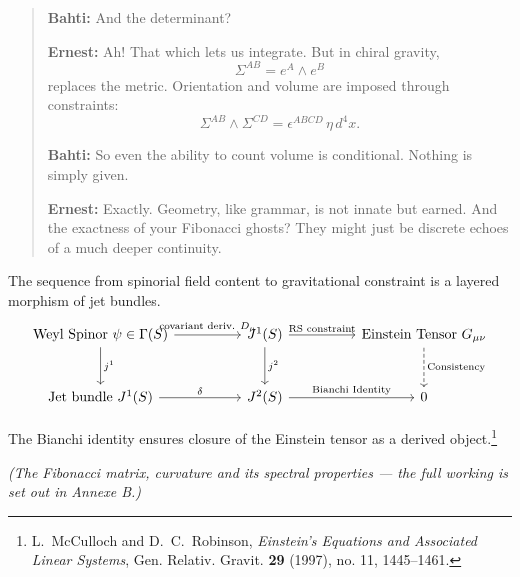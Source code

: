 \begin{quote}
\textbf{Bahti:} And the determinant?

\textbf{Ernest:} Ah! That which lets us integrate. But in chiral gravity,
\begin{equation}
\Sigma^{AB} = e^A \wedge e^B
\end{equation}
replaces the metric. Orientation and volume are imposed through constraints:
\begin{equation}
\Sigma^{AB} \wedge \Sigma^{CD} = \epsilon^{ABCD} \, \eta \, d^4x.
\end{equation}

\textbf{Bahti:} So even the ability to count volume is conditional. Nothing is simply given.

\textbf{Ernest:} Exactly. Geometry, like grammar, is not innate but earned. And the exactness of your Fibonacci ghosts? They might just be discrete echoes of a much deeper continuity.
\end{quote}


\noindent The sequence from spinorial field content to gravitational constraint is a layered morphism of jet bundles.
\begin{equation*}
\begin{tikzcd}[column sep=huge, row sep=large]
\text{Weyl Spinor } \psi \in \Gamma(S)
\arrow[r, "\text{covariant deriv. } D_\mu"]
\arrow[d, "j^1"] &
J^1(S)
\arrow[r, "\text{RS constraint}"]
\arrow[d, "j^2"] &
\text{Einstein Tensor } G_{\mu\nu}
\arrow[d, dashed, "\text{Consistency}"] \\
\text{Jet bundle } J^1(S)
\arrow[r, "\delta"] &
J^2(S)
\arrow[r, "\text{Bianchi Identity}"] &
0
\end{tikzcd}
\end{equation*}

 The Bianchi identity ensures closure of the Einstein tensor as a derived object.\footnote{L.~McCulloch and D.~C.~Robinson, \emph{Einstein's Equations and Associated Linear Systems}, Gen. Relativ. Gravit. \textbf{29} (1997), no. 11, 1445--1461.}


\textit{(The Fibonacci matrix, curvature and its spectral properties --- the full working is set out in Annexe B.)}

